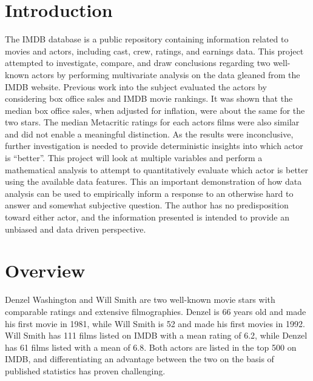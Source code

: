 \documentclass[]{article}
\begin{document}
\vskip -8.5pt




\noindent  

\section{Introduction}
\label{sec:intro}

The IMDB database is a public repository containing information related
to movies and actors, including cast, crew, ratings, and earnings data.
This project attempted to investigate, compare, and draw conclusions
regarding two well-known actors by performing multivariate analysis on
the data gleaned from the IMDB website. Previous work into the subject
evaluated the actors by considering box office sales and IMDB movie
rankings. It was shown that the median box office sales, when adjusted
for inflation, were about the same for the two stars. The median
Metacritic ratings for each actors films were also similar and did not
enable a meaningful distinction. As the results were inconclusive,
further investigation is needed to provide deterministic insights into
which actor is ``better''. This project will look at multiple variables
and perform a mathematical analysis to attempt to quantitatively
evaluate which actor is better using the available data features. This
an important demonstration of how data analysis can be used to
empirically inform a response to an otherwise hard to answer and
somewhat subjective question. The author has no predisposition toward
either actor, and the information presented is intended to provide an
unbiased and data driven perspective.

\section{Overview}
\label{sec:Overview}

Denzel Washington and Will Smith are two well-known movie stars with
comparable ratings and extensive filmographies. Denzel is 66 years old
and made his first movie in 1981, while Will Smith is 52 and made his
first movies in 1992. Will Smith has 111 films listed on IMDB with a
mean rating of 6.2, while Denzel has 61 films listed with a mean of 6.8.
Both actors are listed in the top 500 on IMDB, and differentiating an
advantage between the two on the basis of published statistics has
proven challenging.\newline
\end{document}
